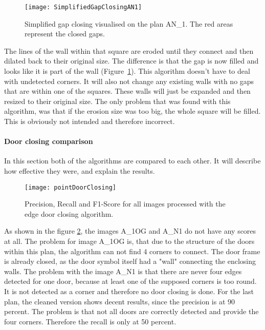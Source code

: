 \begin{figure}[H]
	\centering
	\texttt{[image: SimplifiedGapClosingAN1]}
	\caption{Simplified gap closing visualised on the plan AN\_1. The red areas represent the closed gaps.}
	\label{fig:SimplifiedGapClosingAN1}
\end{figure}

The lines of the wall within that square are eroded until they connect and then dilated back to their original size. The difference is that the gap is now filled and looks like it is part of the wall (Figure~\ref{fig:SimplifiedGapClosingAN1}). This algorithm doesn't have to deal with undetected corners. It will also not change any existing walls with no gaps that are within one of the squares. These walls will just be expanded and then resized to their original size. The only problem that was found with this algorithm, was that if the erosion size was too big, the whole square will be filled. This is obviously not intended and therefore incorrect.

\paragraph{Door closing comparison}
\label{sub:DoorClosingComparison}
In this section both of the algorithms are compared to each other. It will describe how effective they were, and explain the results.

\begin{figure}[H]
	\centering
	\texttt{[image: pointDoorClosing]}
	\caption{Precision, Recall and F1-Score for all images processed with the edge door closing algorithm. }
	\label{fig:pointDoorClosing}
\end{figure}

As shown in the figure \ref{fig:pointDoorClosing}, the images A\_1OG and A\_N1 do not have any scores at all. The problem for image A\_1OG is, that due to the structure of the doors within this plan, the algorithm can not find 4 corners to connect. The door frame is already closed, as the door symbol itself had a "wall" connecting the enclosing walls. The problem with the image A\_N1 is that there are never four edges detected for one door, because at least one of the supposed corners is too round. It is not detected as a corner and therefore no door closing is done. For the last plan, the cleaned version shows decent results, since the precision is at 90 percent. The problem is that not all doors are correctly detected and provide the four corners. Therefore the recall is only at 50 percent.

